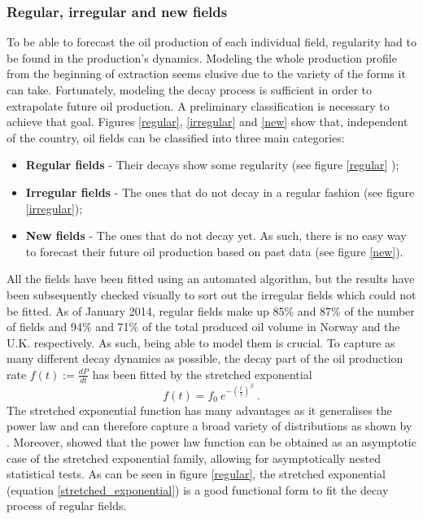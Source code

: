 \documentclass[review]{elsarticle}
\begin{document}
\subsubsection{Regular, irregular and new fields\label{sub:Regular,-irregular-and}}

To be able to forecast the oil production of each individual field,
regularity had to be found in the production's dynamics. Modeling
the whole production profile from the beginning of extraction seems
elusive due to the variety of the forms it can take. Fortunately,
modeling the decay process is sufficient in order to extrapolate future
oil production. A preliminary classification is necessary to achieve
that goal. Figures \ref{regular}, \ref{irregular} and \ref{new}
show that, independent of the country, oil fields can be classified
into three main categories:
\begin{itemize}
\item \textbf{Regular fields} - Their decays show some regularity (see figure \ref{regular} ); 
\item \textbf{Irregular fields} - The ones that do not decay in a regular
fashion (see figure \ref{irregular});
\item \textbf{New fields} - The ones that do not decay yet. As such, there
is no easy way to forecast their future oil production based on past
data (see figure \ref{new}).
\end{itemize}
\noindent All the fields have been fitted using an automated algorithm,
but the results have been subsequently checked visually to sort out
the irregular fields which could not be fitted. As of January 2014,
regular fields make up 85\% and 87\% of the number of fields and 94\%
and 71\% of the total produced oil volume in Norway and the U.K. respectively.
As such, being able to model them is crucial. To capture as many different
decay dynamics as possible, the decay part of the oil production rate
$f(t) := \frac{dP}{dt}$ has been fitted by the stretched exponential  
\begin{equation}
f(t)=f_{0}~e^{-\left(\frac{t}{\tau}\right)^{\beta}}~.
\label{stretched_exponential}
\end{equation}
The stretched exponential function
has many advantages as it generalises the power law and can therefore
capture a broad variety of distributions as shown by \citet{Laherrere1998}. Moreover,
\citet{Malevergne2005} showed that the power law
function can be obtained as an asymptotic case of the stretched
exponential family, allowing for asymptotically nested statistical tests.  As can be seen
in figure \ref{regular}, the stretched exponential (equation \ref{stretched_exponential})
is a good functional form to fit the decay process of regular fields.
\end{document}
